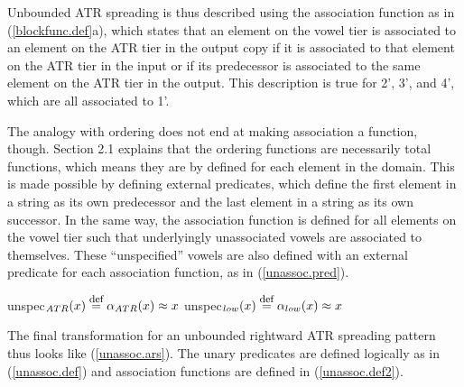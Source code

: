 \documentclass[,doc,floatsintext]{apa6}
\def\defeq{\mathrel{\buildrel \mbox{\footnotesize def} \over =}}
\theoremstyle{definition}
\theoremstyle{definition}
\theoremstyle{definition}
\theoremstyle{remark}
\begin{document}
\noindent Unbounded ATR spreading is thus described using the
association function as in (\ref{blockfunc.def}a), which states that an
element on the vowel tier is associated to an element on the ATR tier in
the output copy if it is associated to that element on the ATR tier in
the input or if its predecessor is associated to the same element on the
ATR tier in the output. This description is true for 2', 3', and 4',
which are all associated to 1'.

The analogy with ordering does not end at making association a function,
though. Section 2.1 explains that the ordering functions are necessarily
total functions, which means they are by defined for each element in the
domain. This is made possible by defining external predicates, which
define the first element in a string as its own predecessor and the last
element in a string as its own successor. In the same way, the
association function is defined for all elements on the vowel tier such
that underlyingly unassociated vowels are associated to themselves.
These \enquote{unspecified} vowels are also defined with an external
predicate for each association function, as in (\ref{unassoc.pred}).

\begin{exe}
\ex \label{unassoc.pred}
  \begin{xlist}
  \ex unspec$_{ATR}(x) \defeq \alpha_{ATR}(x)\approx x$ 
  \ex unspec$_{low}(x) \defeq \alpha_{low}(x)\approx x$
  \end{xlist}
\end{exe}

\noindent The final transformation for an unbounded rightward ATR
spreading pattern thus looks like (\ref{unassoc.ars}). The unary
predicates are defined logically as in (\ref{unassoc.def}) and
association functions are defined in (\ref{unassoc.def2}).
\end{document}
